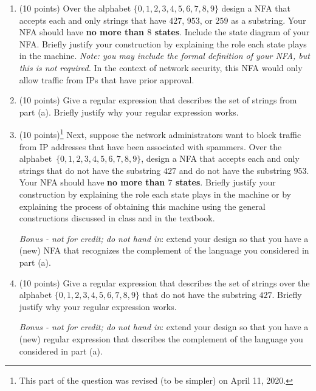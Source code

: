 \begin{enumerate}
\begin{enumerate}
\item (10 points) Over the alphabet $\{0,1,2,3,4,5,6,7,8,9\}$ design a NFA that accepts each and only strings
 that have $427$, $953$, or $259$ as a substring. Your NFA should have {\bf no more than $8$ states}.
 Include the state diagram of your NFA. Briefly justify 
 your construction by explaining the role each state plays in the machine. {\it Note: you may 
 include the formal definition of your NFA, but this is not required.} In the context of network
security, this NFA would only allow traffic from IPs that have prior approval.

\item (10 points) Give a regular expression that describes the set of strings from part (a). Briefly justify
why your regular expression works.

\item (10 points)\footnote{This part of the question was revised (to be simpler) on April 11, 2020.} Next, suppose the network administrators want to block traffic from IP addresses
that have been associated with spammers. Over the alphabet~$\{0,1,2,3,4,5,6,7,8,9\}$, 
design a NFA that accepts each and only strings
 that do not have the substring $427$ and do not have the substring $953$.  Your NFA should have 
 {\bf no more than $7$ states}.  Briefly justify 
 your construction by explaining the role each state plays in the machine or by explaining the process of 
 obtaining this machine using the general constructions discussed in class and in the textbook.

{\it Bonus - not for credit; do not hand in}: extend your design so that you have a (new) NFA that recognizes
the complement of the language you considered in part (a).

\item (10 points) Give a regular expression that describes the set of strings over the alphabet $\{0,1,2,3,4,5,6,7,8,9\}$ 
that do not have the substring $427$. Briefly justify why your regular expression works.

{\it Bonus - not for credit; do not hand in}: extend your design so that you have a (new) regular expression
that describes
the complement of the language you considered in part (a).



\end{enumerate}
\end{enumerate}
